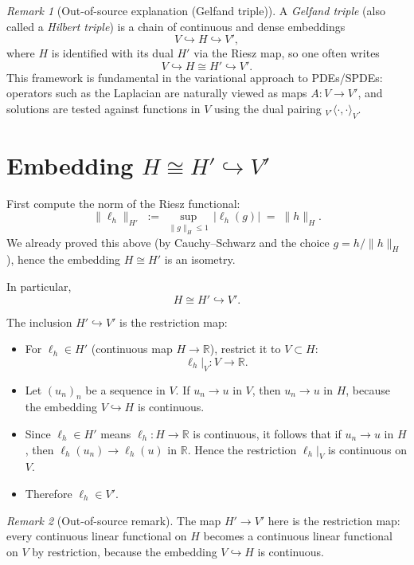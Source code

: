 \documentclass[11pt]{article}
\theoremstyle{definition}
\theoremstyle{remark}
\newtheorem{remark}{Remark}
\begin{document}
\begin{remark}[Out-of-source explanation (Gelfand triple)]
A \emph{Gelfand triple} (also called a \emph{Hilbert triple}) is a chain of continuous and dense embeddings
\[
V \hookrightarrow H \hookrightarrow V',
\]
where $H$ is identified with its dual $H'$ via the Riesz map, so one often writes
\[
V \hookrightarrow H \cong H' \hookrightarrow V'.
\]
This framework is fundamental in the variational approach to PDEs/SPDEs: operators such as the Laplacian are naturally viewed as maps $A:V\to V'$, and solutions are tested against functions in $V$ using the dual pairing ${}_{V'}\langle \cdot,\cdot\rangle_V$.
\end{remark}

\section*{Embedding $H \cong H' \hookrightarrow V'$}

First compute the norm of the Riesz functional:
\[
\|\ell_h\|_{H'}
\;:=\;
\sup_{\|g\|_H\le 1}\,|\ell_h(g)|
\;=\;
\|h\|_H.
\]
We already proved this above (by Cauchy--Schwarz and the choice $g=h/\|h\|_H$), hence the embedding $H\cong H'$ is an isometry.

In particular,
\[
H \cong H' \hookrightarrow V'.
\]

The inclusion $H'\hookrightarrow V'$ is the restriction map:
\begin{itemize}
\item For $\ell_h\in H'$ (continuous map $H\to \mathbb{R}$), restrict it to $V\subset H$:
\[
\ell_h|_V:V\to \mathbb{R}.
\]
\item Let $(u_n)_n$ be a sequence in $V$. If $u_n\to u$ in $V$, then $u_n\to u$ in $H$, because the embedding $V\hookrightarrow H$ is continuous.
\item Since $\ell_h\in H'$ means $\ell_h:H\to\mathbb{R}$ is continuous, it follows that if $u_n\to u$ in $H$, then $\ell_h(u_n)\to \ell_h(u)$ in $\mathbb{R}$. Hence the restriction $\ell_h|_V$ is continuous on $V$.
\item Therefore $\ell_h\in V'$.
\end{itemize}

\begin{remark}[Out-of-source remark]
The map $H' \to V'$ here is the restriction map: every continuous linear functional on $H$ becomes a continuous linear functional on $V$ by restriction, because the embedding $V\hookrightarrow H$ is continuous.
\end{remark}
\end{document}
